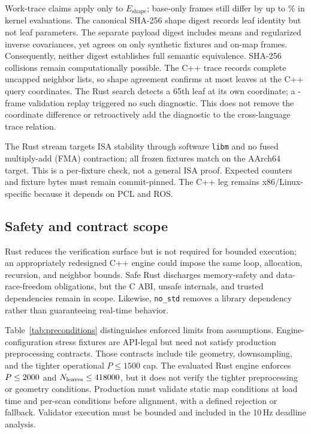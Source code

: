 Work-trace claims apply only to $E_{\mathrm{shape}}$; \realBaseOnly{} base-only frames
still differ by up to \traceRealWorkGapRelMaxPct\% in kernel evaluations. The canonical
SHA-256 shape digest records leaf identity but not leaf parameters. The separate payload
digest includes means and regularized inverse covariances, yet agrees on only
\tracePayloadExactFixtures{} synthetic fixtures and \tracePayloadExactOnMap{} on-map
frames. Consequently, neither digest establishes full semantic equivalence. SHA-256
collisions remain computationally possible. The C++ trace records complete uncapped
neighbor lists, so shape agreement confirms at most \maxnn{} leaves at the C++ query
coordinates. The Rust search detects a 65th leaf at its own coordinate; a
\runtimeValidationFrames{}-frame validation replay triggered no such diagnostic. This
does not remove the coordinate difference or retroactively add the diagnostic to the
cross-language trace relation.

The Rust stream targets ISA stability through software \texttt{libm} and no fused
multiply-add (FMA) contraction; all \raspiTotal{} frozen fixtures match on the AArch64
target. This is a per-fixture check, not a general ISA proof. Expected counters and fixture
bytes must remain commit-pinned. The C++ leg remains x86/Linux-specific because it depends
on PCL and ROS.

\subsection{Safety and contract scope}
Rust reduces the verification surface but is not required for bounded execution; an
appropriately redesigned C++ engine could impose the same loop, allocation, recursion, and
neighbor bounds. Safe Rust discharges memory-safety and data-race-freedom obligations, but
the C ABI, unsafe internals, and trusted dependencies remain in scope. Likewise,
\texttt{no\_std} removes a library dependency rather than guaranteeing real-time behavior.


Table~\ref{tab:preconditions} distinguishes enforced limits from assumptions.
Engine-configuration stress fixtures are API-legal but need not satisfy production
preprocessing contracts. Those contracts include tile geometry, downsampling, and the
tighter operational $P\le1500$ cap. The evaluated Rust engine
enforces $P\le2000$ and $N_{\mathrm{leaves}}\le418000$, but it does
not verify the tighter preprocessing or geometry conditions. Production must
validate static map conditions at load time and per-scan conditions before alignment, with a
defined rejection or fallback. Validator execution must be bounded and included in the
10\,Hz deadline analysis.

